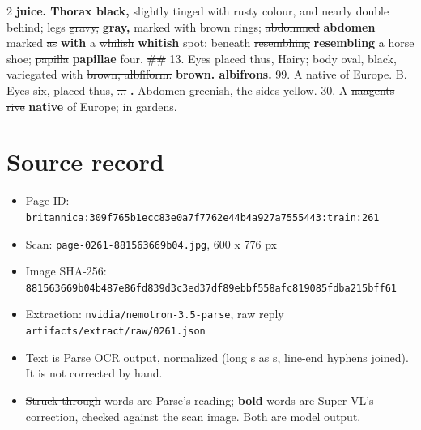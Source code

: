 \documentclass[10pt]{article}
\begin{document}
\begin{multicols}{2}
\textbf{juice. Thorax black,} slightly tinged with rusty colour, and nearly double behind; legs \sout{gravy,} \textbf{gray,} marked with brown rings; \sout{abdommed} \textbf{abdomen} marked \sout{as} \textbf{with} a \sout{whilish} \textbf{whitish} spot; beneath \sout{resembhing} \textbf{resembling} a horse shoe; \sout{papilla} \textbf{papillae} four. \sout{\#\#} 13. Eyes placed thus, Hairy; body oval, black, variegated with \sout{brown, albfiform.} \textbf{brown. albifrons.} 99. A native of Europe. B. Eyes six, placed thus, \sout{...} \textbf{.} Abdomen greenish, the sides yellow. 30. A \sout{naagents rive} \textbf{native} of Europe; in gardens.
\end{multicols}
\section*{Source record}
\begin{itemize}
\item Page ID: \texttt{britannica:309f765b1ecc83e0a7f7762e44b4a927a7555443:train:261}
\item Scan: \texttt{page-0261-881563669b04.jpg}, 600 x 776 px
\item Image SHA-256: \texttt{\small 881563669b04b487e86fd839d3c3ed37df89ebbf558afc819085fdba215bff61}
\item Extraction: \texttt{nvidia/nemotron-3.5-parse}, raw reply \texttt{artifacts/extract/raw/0261.json}
\item Text is Parse OCR output, normalized (long s as s, line-end hyphens joined). It is not corrected by hand.
\item \sout{Struck-through} words are Parse's reading; \textbf{bold} words are Super VL's correction, checked against the scan image. Both are model output.
\end{itemize}
\end{document}
